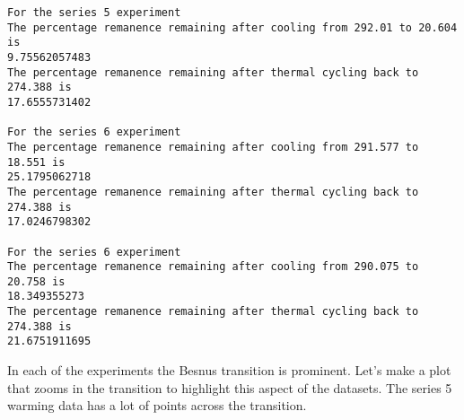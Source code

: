 \documentclass{article}
\begin{document}
    \begin{Verbatim}[commandchars=\\\{\}]
For the series 5 experiment
The percentage remanence remaining after cooling from 292.01 to 20.604 is 
9.75562057483
The percentage remanence remaining after thermal cycling back to 274.388 is 
17.6555731402

For the series 6 experiment
The percentage remanence remaining after cooling from 291.577 to 18.551 is 
25.1795062718
The percentage remanence remaining after thermal cycling back to 274.388 is 
17.0246798302

For the series 6 experiment
The percentage remanence remaining after cooling from 290.075 to 20.758 is 
18.349355273
The percentage remanence remaining after thermal cycling back to 274.388 is 
21.6751911695
    \end{Verbatim}

    In each of the experiments the Besnus transition is prominent. Let's
make a plot that zooms in the transition to highlight this aspect of the
datasets. The series 5 warming data has a lot of points across the
transition.
\end{document}
